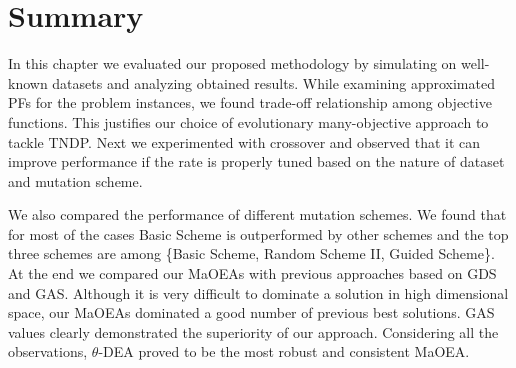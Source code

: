 \section{Summary}

In this chapter we evaluated our proposed methodology by simulating on well-known datasets and analyzing obtained results. While examining approximated PFs for the problem instances, we found trade-off relationship among objective functions. This justifies our choice of evolutionary many-objective approach to tackle TNDP. Next we experimented with crossover and observed that it can improve performance if the rate is properly tuned based on the nature of dataset and mutation scheme. 


We also compared the performance of different mutation schemes. We found that for most of the cases Basic Scheme is outperformed by other schemes and the top three schemes are among \{Basic Scheme, Random Scheme II, Guided Scheme\}. At the end we compared our MaOEAs with previous approaches based on  GDS and GAS. Although it is very difficult to dominate a solution in high dimensional space, our MaOEAs dominated a good number of previous best solutions. GAS values clearly demonstrated the superiority of our approach. Considering all the observations, $\theta$-DEA proved to be the most robust and consistent MaOEA. 


